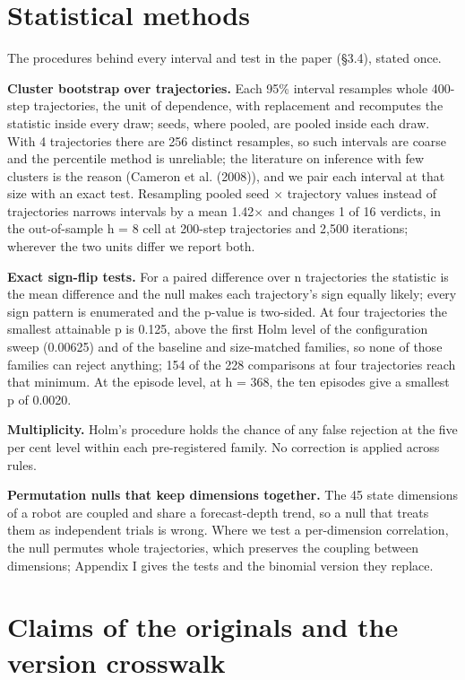 \documentclass[10pt]{article}
\begin{document}
\section{Statistical methods}

The procedures behind every interval and test in the paper (\S{}3.4), stated once.

\textbf{Cluster bootstrap over trajectories.} Each 95\% interval resamples whole 400-step trajectories, the unit of dependence, with replacement and recomputes the statistic inside every draw; seeds, where pooled, are pooled inside each draw. With 4 trajectories there are 256 distinct resamples, so such intervals are coarse and the percentile method is unreliable; the literature on inference with few clusters is the reason (Cameron et al. (2008)), and we pair each interval at that size with an exact test. Resampling pooled seed $\times$ trajectory values instead of trajectories narrows intervals by a mean 1.42$\times$ and changes 1 of 16 verdicts, in the out-of-sample h = 8 cell at 200-step trajectories and 2,500 iterations; wherever the two units differ we report both.

\textbf{Exact sign-flip tests.} For a paired difference over n trajectories the statistic is the mean difference and the null makes each trajectory's sign equally likely; every sign pattern is enumerated and the p-value is two-sided. At four trajectories the smallest attainable p is 0.125, above the first Holm level of the configuration sweep (0.00625) and of the baseline and size-matched families, so none of those families can reject anything; 154 of the 228 comparisons at four trajectories reach that minimum. At the episode level, at h = 368, the ten episodes give a smallest p of 0.0020.

\textbf{Multiplicity.} Holm's procedure holds the chance of any false rejection at the five per cent level within each pre-registered family. No correction is applied across rules.

\textbf{Permutation nulls that keep dimensions together.} The 45 state dimensions of a robot are coupled and share a forecast-depth trend, so a null that treats them as independent trials is wrong. Where we test a per-dimension correlation, the null permutes whole trajectories, which preserves the coupling between dimensions; Appendix I gives the tests and the binomial version they replace.

\section{Claims of the originals and the version crosswalk}
\end{document}
